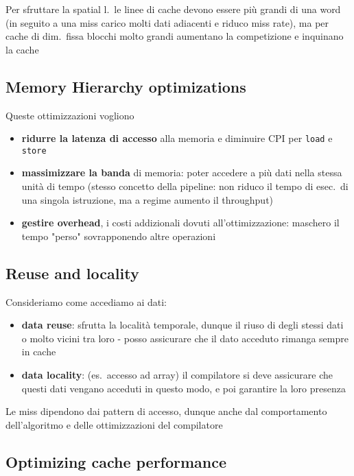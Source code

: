   \begin{emphasize}
      Per sfruttare la spatial l.~le linee di cache devono essere pi\`u grandi di una word (in seguito a una miss carico molti dati adiacenti e riduco miss rate), ma per cache di dim.~fissa blocchi molto grandi aumentano la competizione e inquinano la cache
  \end{emphasize}

\subsection{Memory Hierarchy optimizations}

Queste ottimizzazioni vogliono
\begin{itemize}
  \item \textbf{ridurre la latenza di accesso} alla memoria e diminuire CPI per \lstinline|load| e \lstinline|store|
  \item \textbf{massimizzare la banda} di memoria: poter accedere a pi\`u dati nella stessa unit\`a di tempo (stesso concetto della pipeline: non riduco il tempo di esec.~di una singola istruzione, ma a regime aumento il throughput) 
  \item \textbf{gestire overhead}, i costi addizionali dovuti all'ottimizzazione: maschero il tempo "perso" sovrapponendo altre operazioni
\end{itemize}

\subsection{Reuse and locality}

Consideriamo come accediamo ai dati:
\begin{itemize}
  \item \textbf{data reuse}: sfrutta la localit\`a temporale, dunque il riuso di degli stessi dati o molto vicini tra loro - posso assicurare che il dato acceduto rimanga sempre in cache
  \item \textbf{data locality}: (es.~accesso ad array) il compilatore si deve assicurare che questi dati vengano acceduti in questo modo, e poi garantire la loro presenza
\end{itemize}
\begin{emphasize}
  Le miss dipendono dai pattern di accesso, dunque anche dal comportamento dell'algoritmo e delle ottimizzazioni del compilatore
\end{emphasize}

\subsection{Optimizing cache performance}
\label{cache-opt}

